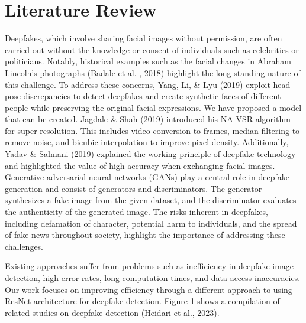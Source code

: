 \chapter{Literature Review}
Deepfakes, which involve sharing facial images without permission, are often carried out without the knowledge or consent of individuals such as celebrities or politicians.
 Notably, historical examples such as the facial changes in  Abraham Lincoln's photographs (Badale et al.
, 2018)\cite{badale2018deep} highlight the long-standing nature of this challenge.
 To address these concerns, Yang, Li, \& Lyu (2019)\cite{yang2019exposing} exploit head pose discrepancies to detect deepfakes and create synthetic faces of different people while preserving the original facial expressions.
 We have proposed a model that can be created.
 Jagdale \& Shah (2019)\cite{jagdale2019novel} introduced his NA-VSR algorithm for super-resolution.
 This includes video conversion to frames, median filtering to remove noise, and bicubic interpolation to improve pixel density.
 Additionally, Yadav \& Salmani (2019)\cite{yadav2019deepfake} explained the working principle of deepfake technology and highlighted the value of high accuracy when exchanging facial images.
 Generative adversarial neural networks (GANs) play a central role in deepfake generation and consist of generators and discriminators.
 The generator synthesizes a fake image from the given dataset, and the discriminator evaluates the authenticity of the generated image.
 The risks inherent in deepfakes, including defamation of character, potential harm to individuals, and the spread of fake news throughout society, highlight the importance of addressing these challenges.
 
 Existing approaches suffer from problems such as inefficiency in deepfake image detection, high error rates, long computation times, and data access inaccuracies.
 Our work focuses on improving efficiency through a different approach to using ResNet architecture for deepfake detection.
 Figure 1 shows a compilation of related studies on deepfake detection (Heidari et al., 2023)\cite{heidari2023deepfake}.

